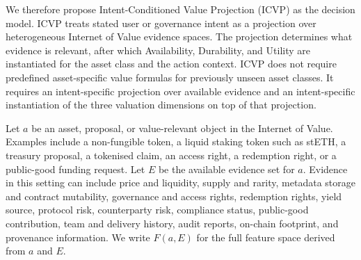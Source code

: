 We therefore propose Intent-Conditioned Value Projection (ICVP) as the decision model. ICVP treats stated user or governance intent as a projection over heterogeneous Internet of Value evidence spaces. The projection determines what evidence is relevant, after which Availability, Durability, and Utility are instantiated for the asset class and the action context. ICVP does not require predefined asset-specific value formulas for previously unseen asset classes. It requires an intent-specific projection over available evidence and an intent-specific instantiation of the three valuation dimensions on top of that projection.

Let $a$ be an asset, proposal, or value-relevant object in the Internet of Value. Examples include a non-fungible token, a liquid staking token such as stETH, a treasury proposal, a tokenised claim, an access right, a redemption right, or a public-good funding request. Let $E$ be the available evidence set for $a$. Evidence in this setting can include price and liquidity, supply and rarity, metadata storage and contract mutability, governance and access rights, redemption rights, yield source, protocol risk, counterparty risk, compliance status, public-good contribution, team and delivery history, audit reports, on-chain footprint, and provenance information. We write $F(a, E)$ for the full feature space derived from $a$ and $E$.

